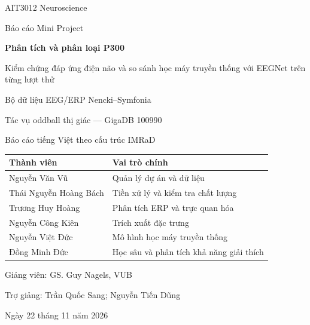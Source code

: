 \documentclass[11pt,a4paper]{article}
\begin{document}
\hypersetup{pageanchor=false}
\begin{titlepage}
\centering
{\sffamily\Large AIT3012 Neuroscience\par}
\vspace{7mm}
{\sffamily\large Báo cáo Mini Project\par}
\vspace{16mm}
{\sffamily\bfseries\LARGE Phân tích và phân loại P300\par}
\vspace{4mm}
{\sffamily\Large Kiểm chứng đáp ứng điện não và so sánh học máy truyền thống với EEGNet trên từng lượt thử\par}
\vspace{10mm}
{\large Bộ dữ liệu EEG/ERP Nencki--Symfonia\par}
{Tác vụ oddball thị giác --- GigaDB 100990\par}
\vspace{4mm}
{Báo cáo tiếng Việt theo cấu trúc IMRaD\par}
\vspace{10mm}
\begin{tabular}{ll}
\toprule
\textbf{Thành viên} & \textbf{Vai trò chính}\\\midrule
Nguyễn Văn Vũ & Quản lý dự án và dữ liệu\\
Thái Nguyễn Hoàng Bách & Tiền xử lý và kiểm tra chất lượng\\
Trương Huy Hoàng & Phân tích ERP và trực quan hóa\\
Nguyễn Công Kiên & Trích xuất đặc trưng\\
Nguyễn Việt Đức & Mô hình học máy truyền thống\\
Đồng Minh Đức & Học sâu và phân tích khả năng giải thích\\
\bottomrule
\end{tabular}
\vfill
{Giảng viên: GS. Guy Nagels, VUB\par}
{Trợ giảng: Trần Quốc Sang; Nguyễn Tiến Dũng\par}
\vspace{4mm}
{Ngày 22 tháng 11 năm 2026\par}
\end{titlepage}
\hypersetup{pageanchor=true}
\end{document}
